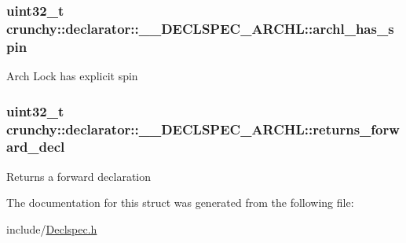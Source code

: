 \subsubsection[{archl\+\_\+has\+\_\+spin}]{\setlength{\rightskip}{0pt plus 5cm}uint32\+\_\+t crunchy\+::declarator\+::\+\_\+\+\_\+\+D\+E\+C\+L\+S\+P\+E\+C\+\_\+\+A\+R\+C\+H\+L\+::archl\+\_\+has\+\_\+spin}\label{structcrunchy_1_1declarator_1_1_____d_e_c_l_s_p_e_c___a_r_c_h_l_aadc3174237edfc7511f0b8bd94fde0ba}
Arch Lock has explicit spin \hypertarget{structcrunchy_1_1declarator_1_1_____d_e_c_l_s_p_e_c___a_r_c_h_l_a73a2d868629fed82ad40089b1a7066d4}{}
\subsubsection[{returns\+\_\+forward\+\_\+decl}]{\setlength{\rightskip}{0pt plus 5cm}uint32\+\_\+t crunchy\+::declarator\+::\+\_\+\+\_\+\+D\+E\+C\+L\+S\+P\+E\+C\+\_\+\+A\+R\+C\+H\+L\+::returns\+\_\+forward\+\_\+decl}\label{structcrunchy_1_1declarator_1_1_____d_e_c_l_s_p_e_c___a_r_c_h_l_a73a2d868629fed82ad40089b1a7066d4}
Returns a forward declaration 

The documentation for this struct was generated from the following file\+:\begin{DoxyCompactItemize}
\item 
include/\hyperlink{_declspec_8h}{Declspec.\+h}\end{DoxyCompactItemize}
